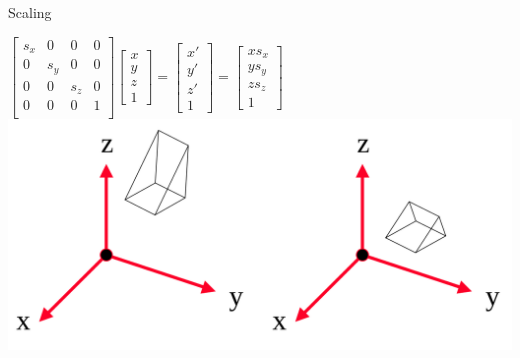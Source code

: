 \documentclass[xcolor=table]{beamer}
\begin{document}
\begin{frame}{Scaling}

\centering
$
\begin{bmatrix}
s_x & 0 & 0 & 0 \\
0 & s_y & 0 & 0 \\
0 & 0 & s_z & 0 \\
0 & 0 & 0 & 1 \\
\end{bmatrix}
\begin{bmatrix}
x \\ y \\ z \\ 1
\end{bmatrix}
=
\begin{bmatrix}
x' \\ y' \\ z' \\ 1
\end{bmatrix}
=
\begin{bmatrix}
x s_x \\ y s_y \\ z s_z \\ 1
\end{bmatrix}
$
\\
\includegraphics[scale=0.20]{media/scaling.png}

\end{frame}
\end{document}
